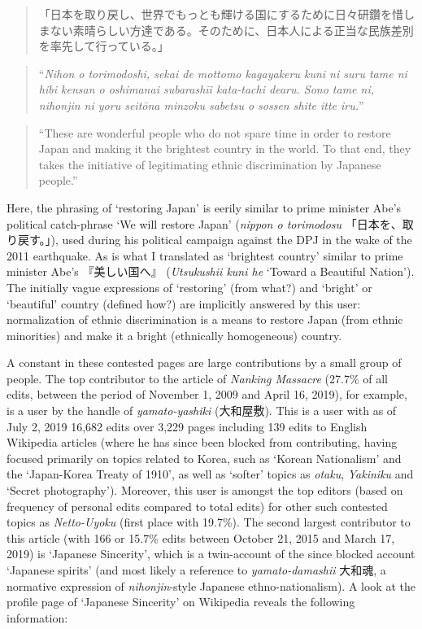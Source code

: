 \documentclass[10pt,british,A4paper,,openany]{memoir}
\begin{document}
\begin{quote}
「日本を取り戻し、世界でもっとも輝ける国にするために日々研鑽を惜しまない素晴らしい方達である。そのために、日本人による正当な民族差別を率先して行っている。」
\end{quote}

\begin{quote}
``\emph{Nihon o torimodoshi, sekai de mottomo kagayakeru kuni ni suru
tame ni hibi kensan o oshimanai subarashīi kata-tachi dearu. Sono tame
ni, nihonjin ni yoru seitōna minzoku sabetsu o sossen shite itte iru.}''
\end{quote}

\begin{quote}
``These are wonderful people who do not spare time in order to restore
Japan and making it the brightest country in the world. To that end,
they takes the initiative of legitimating ethnic discrimination by
Japanese people.''
\end{quote}

Here, the phrasing of `restoring Japan' is eerily similar to prime
minister Abe's political catch-phrase `We will restore Japan'
(\emph{nippon o torimodosu} 「日本を、取り戻す。」), used during his
political campaign against the DPJ in the wake of the 2011 earthquake.
As is what I translated as `brightest country' similar to prime minister
Abe's 『美しい国へ』 (\emph{Utsukushii kuni he} `Toward a Beautiful
Nation'). The initially vague expressions of `restoring' (from what?)
and `bright' or `beautiful' country (defined how?) are implicitly
answered by this user: normalization of ethnic discrimination is a means
to restore Japan (from ethnic minorities) and make it a bright
(ethnically homogeneous) country.

A constant in these contested pages are large contributions by a small
group of people. The top contributor to the article of \emph{Nanking
Massacre} (27.7\% of all edits, between the period of November 1, 2009
and April 16, 2019), for example, is a user by the handle of
\emph{yamato-yashiki} (大和屋敷). This is a user with as of July 2, 2019
16,682 edits over 3,229 pages including 139 edits to English Wikipedia
articles (where he has since been blocked from contributing, having
focused primarily on topics related to Korea, such as `Korean
Nationalism' and the `Japan-Korea Treaty of 1910', as well as `softer'
topics as \emph{otaku}, \emph{Yakiniku} and `Secret photography').
Moreover, this user is amongst the top editors (based on frequency of
personal edits compared to total edits) for other such contested topics
as \emph{Netto-Uyoku} (first place with 19.7\%). The second largest
contributor to this article (with 166 or 15.7\% edits between October
21, 2015 and March 17, 2019) is `Japanese Sincerity', which is a
twin-account of the since blocked account `Japanese spirits' (and most
likely a reference to \emph{yamato-damashii} 大和魂, a normative
expression of \emph{nihonjin}-style Japanese ethno-nationalism). A look
at the profile page of `Japanese Sincerity' on Wikipedia reveals the
following information:
\end{document}
